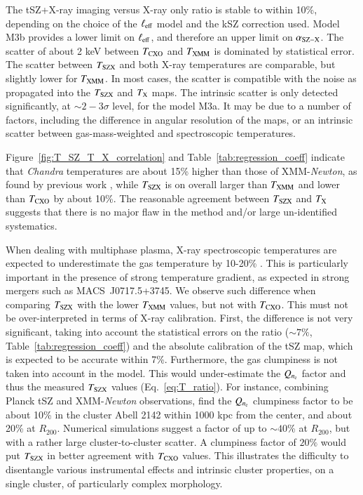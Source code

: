 \documentclass[twocolumn,traditabstract]{aa}
\newcommand{\ccor}[1]{\textcolor{Mypink}{#1}}
\def\TSZ {T_{\rm SZX}}
\def \TXC {T_{\rm CXO}}
\def \TXX {T_{\rm XMM}}
\def \TX {T_{\rm X}}
\begin{document}
The tSZ+X-ray imaging versus X-ray only ratio is stable to within 10\%, depending on the choice of the $\ell_{\rm eff}$ model and the kSZ correction used. Model M3b provides a lower limit on $\ell_{\rm eff}$, and therefore an upper limit on $\alpha_{\rm SZ-X}$. The scatter of about 2 keV between $\TXC$ and $\TXX$ is dominated by statistical error. The scatter between $\TSZ$ and both X-ray temperatures are comparable, \ccor{but slightly lower for $\TXX$}. \ccor{In most cases, the scatter is compatible with the noise as propagated into the $\TSZ$ and $\TX$ maps. The intrinsic scatter is only detected significantly, at $\sim 2-3\sigma$ level, for the model M3a. It may be due to a number of factors, including the difference in angular resolution of the maps, or an intrinsic scatter between gas-mass-weighted and spectroscopic temperatures.}

Figure~\ref{fig:T_SZ_T_X_correlation} and Table~\ref{tab:regression_coeff} indicate that \textit{Chandra} temperatures are about 15\% higher than those of XMM-\textit{Newton}, as found by previous work \citep{Mahdavi2013,sch15}, \ccor{while $\TSZ$ is on overall larger than $\TXX$ and lower than $\TXC$ by about 10\%. The reasonable agreement between $\TSZ$ and $\TX$ suggests that there is no major flaw in the method and/or large un-identified systematics.}

\ccor{When dealing with multiphase plasma, X-ray spectroscopic temperatures are expected to underestimate the gas temperature by 10-20\% \citep{Mathiesen2001,maz04}. This is particularly important in the presence of strong temperature gradient, as expected in strong mergers such as \mbox{MACS~J0717.5+3745}. We observe such difference when comparing $\TSZ$ with the lower $\TXX$ values, but not with $\TXC$. This must not be over-interpreted in terms of X-ray calibration. First, the difference is not very significant, taking into account the statistical errors on the ratio ($\sim 7\%$, Table~\ref{tab:regression_coeff}) and the absolute calibration of the tSZ map, which is expected to be accurate within 7\%. Furthermore, the gas clumpiness is not taken into account in the model. This would under-estimate the $Q_{n_{\rm e}}$ factor and thus the measured $\TSZ$ values (Eq.~\ref{eq:T_ratio}). For instance, combining Planck tSZ \citep{Planck2015I} and XMM-\textit{Newton} observations, \citep{Tchernin2016} find the $Q_{n_{\rm e}}$ clumpiness factor to be about 10\% in the cluster Abell 2142 within 1000 kpc from the center, and about 20\% at $R_{200}$. Numerical simulations \citep[e.g.,][]{Nagai2011,Zhuravleva2013,Vazza2013} suggest a factor of up to $\sim 40$\% at $R_{200}$, but with a rather large cluster-to-cluster scatter. A clumpiness factor of $20\%$ would put $\TSZ$ in better agreement with $\TXC$ values. This illustrates the difficulty to disentangle various instrumental effects and intrinsic cluster properties, on a single cluster, of particularly complex morphology.} 
\end{document}
